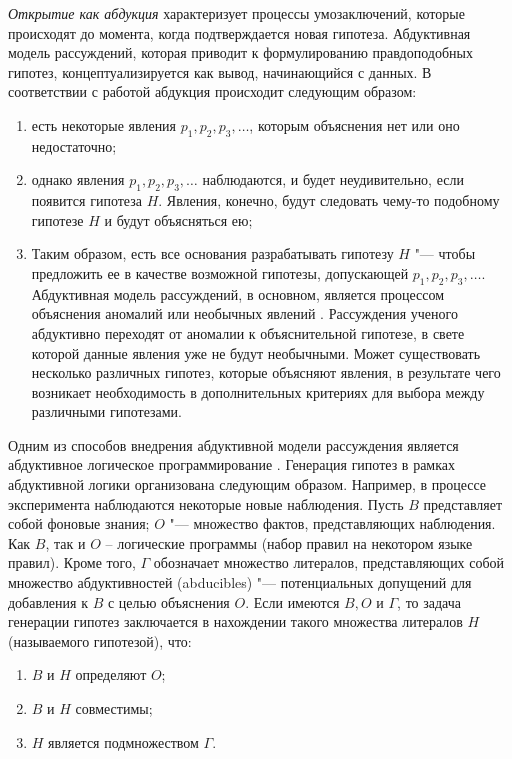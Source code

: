 \textit{Открытие как абдукция} характеризует процессы умозаключений, которые происходят до момента, когда 
подтверждается новая гипотеза. Абдуктивная модель рассуждений, которая приводит к формулированию правдоподобных гипотез, 
концептуализируется как вывод, начинающийся с данных. В соответствии с работой \cite{nickles1980scientific} абдукция 
происходит следующим образом:

\begin{enumerate}
    \item есть некоторые явления $p_1, p_2, p_3, \ldots $, которым объяснения нет или оно недостаточно;
    \item однако явления  $p_1, p_2, p_3, \ldots $ наблюдаются, и будет неудивительно, если появится гипотеза $H$. 
            Явления, конечно, будут следовать чему-то подобному гипотезе $H$ и будут объясняться ею; 
    \item Таким образом, есть все основания разрабатывать гипотезу $H$ "--- чтобы предложить ее в качестве возможной 
            гипотезы, допускающей $p_1, p_2, p_3, \ldots $. Абдуктивная модель рассуждений, в основном, является 
            процессом объяснения аномалий или необычных явлений \cite{Schickore2014}. Рассуждения ученого абдуктивно 
            переходят от аномалии к объяснительной гипотезе, в свете которой данные явления уже не будут необычными. 
            Может существовать несколько различных гипотез, которые объясняют явления, в результате чего возникает 
            необходимость в дополнительных критериях для выбора между различными гипотезами.
\end{enumerate}

Одним из способов внедрения абдуктивной модели рассуждения является абдуктивное логическое программирование 
\cite{Kakas1992}. Генерация гипотез в рамках абдуктивной логики организована следующим образом. Например, в процессе 
эксперимента наблюдаются некоторые новые наблюдения. Пусть $B$ представляет собой фоновые знания; $O$ "--- множество 
фактов, представляющих наблюдения. Как $B$, так и $O$ – логические программы (набор правил на некотором языке правил). 
Кроме того, $\Gamma$ обозначает множество литералов, представляющих собой множество абдуктивностей (abducibles) "--- 
потенциальных допущений для добавления к $B$ с целью объяснения $O$. Если имеются $B, O$ и $\Gamma$, то задача 
генерации гипотез заключается в нахождении такого множества литералов $H$ (называемого гипотезой), что: 

\begin{enumerate}
    \item $B$ и $H$ определяют $O$;
    \item $B$ и $H$ совместимы;
    \item $H$ является подмножеством $\Gamma$.
\end{enumerate}



